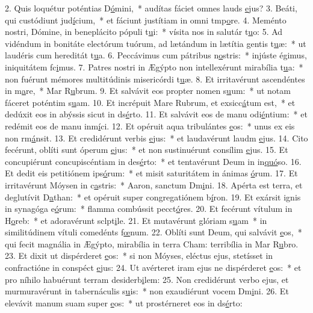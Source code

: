 2. Quis loquétur poténtias D\uline{ó}mini,~* audítas fáciet omnes lauds \uline{e}jus?
3. Beáti, qui custódiunt jud\uline{í}cium,~* et fáciunt justítiam in omni tmp\uline{o}re.
4. Meménto nostri, Dómine, in beneplácito pópuli t\uline{u}i:~* vísita nos in salutár t\uline{u}o:
5. Ad vidéndum in bonitáte electórum tuórum, ad lætándum in lætítia gentis t\uline{u}æ:~* ut laudéris cum hereditát t\uline{u}a.
6. Peccávimus cum pátribus n\uline{o}stris:~* injúste égimus, iniquitátem fc\uline{i}mus.
7. Patres nostri in Ægýpto non intellexérunt mirabília t\uline{u}a:~* non fuérunt mémores multitúdinis misericórdi t\uline{u}æ.
8. Et irritavérunt ascendéntes in m\uline{a}re,~* Mar R\uline{u}brum.
9. Et salvávit eos propter nomen s\uline{u}um:~* ut notam fáceret poténtim s\uline{u}am.
10. Et incrépuit Mare Rubrum, et exsicc\uline{á}tum est,~* et dedúxit eos in abýssis sicut in ds\uline{é}rto.
11. Et salvávit eos de manu odi\uline{é}ntium:~* et redémit eos de manu inm\uline{í}ci.
12. Et opéruit aqua tribulántes \uline{e}os:~* unus ex eis non rm\uline{á}nsit.
13. Et credidérunt verbis \uline{e}jus:~* et laudavérunt laudm \uline{e}jus.
14. Cito fecérunt, oblíti sunt óperum \uline{e}jus:~* et non sustinuérunt consílim \uline{e}jus.
15. Et concupiérunt concupiscéntiam in des\uline{é}rto:~* et tentavérunt Deum in in\uline{quó}so.
16. Et dedit eis petitiónem ips\uline{ó}rum:~* et misit saturitátem in ánimas \uline{ó}rum.
17. Et irritavérunt Móysen in c\uline{a}stris:~* Aaron, sanctum Dm\uline{i}ni.
18. Apérta est terra, et deglutívit D\uline{a}than:~* et opéruit super congregatiónem b\uline{í}ron.
19. Et exársit ignis in synagóga e\uline{ó}rum:~* flamma combússit pecct\uline{ó}res.
20. Et fecérunt vítulum in H\uline{o}reb:~* et adoravérunt sclpt\uline{i}le.
21. Et mutavérunt glóriam s\uline{u}am~* in similitúdinem vítuli comedénts f\uline{œ}num.
22. Oblíti sunt Deum, qui salvávit \uline{e}os,~* qui fecit magnália in Ægýpto, mirabília in terra Cham: terribília in Mar R\uline{u}bro.
23. Et dixit ut dispérderet \uline{e}os:~* si non Móyses, eléctus ejus, stetísset in confractióne in conspéct \uline{e}jus:
24. Ut avérteret iram ejus ne dispérderet \uline{e}os:~* et pro níhilo habuérunt terram desiderb\uline{i}lem:
25. Non credidérunt verbo ejus, et murmuravérunt in tabernáculis s\uline{u}is:~* non exaudiérunt vocem Dm\uline{i}ni.
26. Et elevávit manum suam super \uline{e}os:~* ut prostérneret eos in ds\uline{é}rto:
